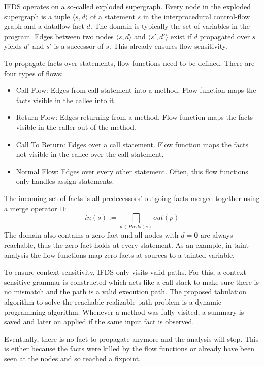 \documentclass[../draft.tex]{subfiles}
\begin{document}
    IFDS operates on a so-called exploded supergraph. Every node in the exploded supergraph is a tuple $\langle s, d \rangle$ of a statement $s$ in the interprocedural control-flow graph and a dataflow fact $d$. The domain is typically the set of variables in the program. Edges between two nodes $\langle s, d \rangle$ and $\langle s', d' \rangle$ exist if $d$ propagated over $s$ yields $d'$ and $s'$ is a successor of $s$. This already ensures flow-sensitivity.

    To propagate facts over statements, flow functions need to be defined. There are four types of flows:
    \begin{itemize}
        \item Call Flow: Edges from call statement into a method. Flow function maps the facts visible in the callee into it. 
        \item Return Flow: Edges returning from a method. Flow function maps the facts visible in the caller out of the method.
        \item Call To Return: Edges over a call statement. Flow function maps the facts not visible in the callee over the call statement.
        \item Normal Flow: Edges over every other statement. Often, this flow functions only handles assign statements.
    \end{itemize}
    The incoming set of facts is all predecessors' outgoing facts merged together using a merge operator $\sqcap$: 
    $$in(s) := \bigsqcap_{p \in Preds(s)} out(p)$$
    The domain also contains a zero fact and all nodes with $d=\textbf{0}$ are always reachable, thus the zero fact holds at every statement. As an example, in taint analysis the flow functions map zero facts at sources to a tainted variable. 

    To ensure context-sensitivity, IFDS only visits valid paths. For this, a context-sensitive grammar is constructed which acts like a call stack to make sure there is no mismatch and the path is a valid execution path.
    The proposed tabulation algorithm to solve the reachable realizable path problem is a dynamic programming algorithm. Whenever a method was fully visited, a summary is saved and later on applied if the same input fact is observed. 

    Eventually, there is no fact to propagate anymore and the analysis will stop. This is either because the facts were killed by the flow functions or already have been seen at the nodes and so reached a fixpoint.
\end{document}
